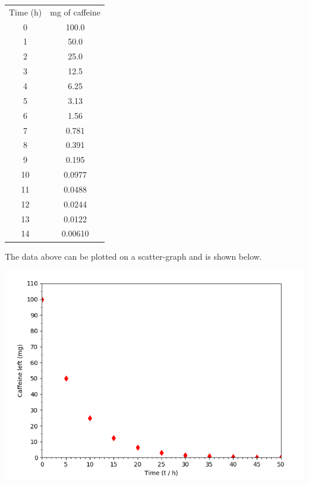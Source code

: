 \documentclass[12pt]{article}
\begin{document}
                \begin{center}
                        \begin{tabular}{cc}
                        Time (h) & mg of caffeine       \\
                        0 & 100.0\\ 
                        1 & 50.0  \\ 
                        2 & 25.0   \\
                        3 & 12.5    \\ 
                        4 & 6.25     \\ 
                        5 & 3.13      \\ 
                        6 & 1.56       \\
                        7 & 0.781       \\
                        8 & 0.391        \\
                        9 & 0.195         \\ 
                        10 & 0.0977        \\ 
                        11 & 0.0488         \\ 
                        12 & 0.0244          \\ 
                        13 & 0.0122           \\
                        14 & 0.00610           \\
                        
                                           
                        \end{tabular}
                        
                \end{center}
                
                The data above can be plotted on a scatter-graph and is shown below.
                
                \begin{center}
                        \includegraphics[scale=0.8]{table1.png}
                \end{center}
\end{document}
